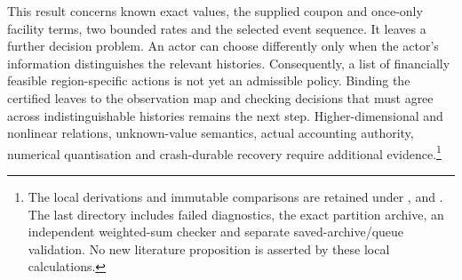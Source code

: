 This result concerns known exact values, the supplied coupon and once-only facility terms, two bounded rates and the selected event sequence. It leaves a further decision problem. An actor can choose differently only when the actor's information distinguishes the relevant histories. Consequently, a list of financially feasible region-specific actions is not yet an admissible policy. Binding the certified leaves to the observation map and checking decisions that must agree across indistinguishable histories remains the next step. Higher-dimensional and nonlinear relations, unknown-value semantics, actual accounting authority, numerical quantisation and crash-durable recovery require additional evidence.\footnote{The local derivations and immutable comparisons are retained under ,  and . The last directory includes failed diagnostics, the exact partition archive, an independent weighted-sum checker and separate saved-archive/queue validation. No new literature proposition is asserted by these local calculations.}
